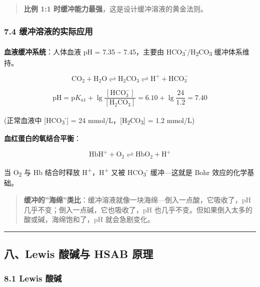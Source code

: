 \begin{quote}
\textbf{比例 1:1 时缓冲能力最强}，这是设计缓冲溶液的黄金法则。
\end{quote}

\subsubsection{7.4 缓冲溶液的实际应用}\label{ux7f13ux51b2ux6eb6ux6db2ux7684ux5b9eux9645ux5e94ux7528}

\textbf{血液缓冲系统}：人体血液 pH = 7.35 \textasciitilde{} 7.45，主要由 HCO\textsubscript{3}\textsuperscript{-}/H\textsubscript{2}CO\textsubscript{3} 缓冲体系维持。

\[
\mathrm{CO_2 + H_2O \rightleftharpoons H_2CO_3 \rightleftharpoons H^+ + HCO_3^-}
\]

\[
\mathrm{pH} = \mathrm{p}K_{a1} + \lg\frac{[\mathrm{HCO_3^-}]}{[\mathrm{H_2CO_3}]} = 6.10 + \lg\frac{24}{1.2} = 7.40
\]

(正常血液中 {[}HCO\textsubscript{3}\textsuperscript{-}{]} = 24 mmol/L，{[}H\textsubscript{2}CO\textsubscript{3}{]} = 1.2 mmol/L)

\textbf{血红蛋白的氧结合平衡}：

\[
\mathrm{HbH^+ + O_2 \rightleftharpoons HbO_2 + H^+}
\]

当 O\textsubscript{2} 与 Hb 结合时释放 H\textsuperscript{+}，H\textsuperscript{+} 又被 HCO\textsubscript{3}\textsuperscript{-} 缓冲---这就是 Bohr 效应的化学基础。

\begin{quote}
\textbf{缓冲的''海绵''类比}：缓冲溶液就像一块海绵---倒入一点酸，它吸收了，pH 几乎不变；倒入一点碱，它也吸收了，pH 也几乎不变。但如果倒入太多的酸或碱，海绵饱和了，pH 就会急剧变化。
\end{quote}

\begin{center}\rule{0.5\linewidth}{0.5pt}\end{center}

\subsection{八、Lewis 酸碱与 HSAB 原理}\label{ux516blewis-ux9178ux78b1ux4e0e-hsab-ux539fux7406}

\subsubsection{8.1 Lewis 酸碱}\label{lewis-ux9178ux78b1}

